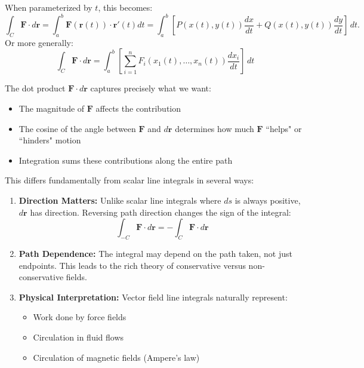 \noindent When parameterized by $t$, this becomes:
\[
\int_C \mathbf{F} \cdot d\mathbf{r} = \int_{a}^{b} \mathbf{F}(\mathbf{r}(t))\cdot\mathbf{r}'(t)dt = \int_a^b \left[P(x(t),y(t))\frac{dx}{dt} + Q(x(t),y(t))\frac{dy}{dt}\right]\,dt.
\]
\noindent Or more generally:
\[
\int_C \mathbf{F} \cdot d\mathbf{r} = \int_a^b \left[\sum_{i=1}^n F_i(x_1(t),\ldots,x_n(t))\frac{dx_i}{dt}\right]\,dt
\]

\noindent The dot product $\mathbf{F} \cdot d\mathbf{r}$ captures precisely what we want:
\begin{itemize}
    \item The magnitude of $\mathbf{F}$ affects the contribution
    \item The cosine of the angle between $\mathbf{F}$ and $d\mathbf{r}$ determines how much $\mathbf{F}$ ``helps" or ``hinders" motion
    \item Integration sums these contributions along the entire path
\end{itemize}

\noindent This differs fundamentally from scalar line integrals in several ways:

\begin{enumerate}
    \item \textbf{Direction Matters:} Unlike scalar line integrals where $ds$ is always positive, $d\mathbf{r}$ has direction. Reversing path direction changes the sign of the integral:
    \[
    \int_{-C} \mathbf{F} \cdot d\mathbf{r} = -\int_C \mathbf{F} \cdot d\mathbf{r}
    \]
    \item \textbf{Path Dependence:} The integral may depend on the path taken, not just endpoints. This leads to the rich theory of conservative versus non-conservative fields.
    \item \textbf{Physical Interpretation:} Vector field line integrals naturally represent:
    \begin{itemize}
        \item Work done by force fields
        \item Circulation in fluid flows
        \item Circulation of magnetic fields (Ampere's law)
    \end{itemize}
\end{enumerate}

